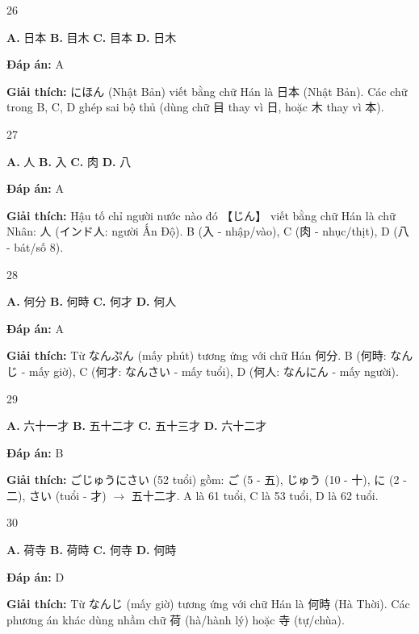 \documentclass[12pt,a4paper]{report}
\newcommand{\source}[1]{}
\newcommand{\choice}[2]{\textbf{#1.} #2 \quad}
\newcommand{\answer}[1]{\par\textbf{Đáp án:} #1}
\newcommand{\confidence}[1]{}
\newcommand{\explain}[1]{\par\textbf{Giải thích:} #1\vspace{0.5cm}}
\begin{document}
\begin{question}{26}
\source{Q5.jpg}
\choice{A}{日本}
\choice{B}{目木}
\choice{C}{目本}
\choice{D}{日木}
\answer{A}
\confidence{high}
\explain{にほん (Nhật Bản) viết bằng chữ Hán là 日本 (Nhật Bản). Các chữ trong B, C, D ghép sai bộ thủ (dùng chữ 目 thay vì 日, hoặc 木 thay vì 本).}
\end{question}

\begin{question}{27}
\source{Q6.jpg}
\choice{A}{人}
\choice{B}{入}
\choice{C}{肉}
\choice{D}{八}
\answer{A}
\confidence{high}
\explain{Hậu tố chỉ người nước nào đó 【じん】 viết bằng chữ Hán là chữ Nhân: 人 (インド人: người Ấn Độ). B (入 - nhập/vào), C (肉 - nhục/thịt), D (八 - bát/số 8).}
\end{question}

\begin{question}{28}
\source{Q7.jpg}
\choice{A}{何分}
\choice{B}{何時}
\choice{C}{何才}
\choice{D}{何人}
\answer{A}
\confidence{high}
\explain{Từ なんぷん (mấy phút) tương ứng với chữ Hán 何分. B (何時: なんじ - mấy giờ), C (何才: なんさい - mấy tuổi), D (何人: なんにん - mấy người).}
\end{question}

\begin{question}{29}
\source{Q8.jpg}
\choice{A}{六十一才}
\choice{B}{五十二才}
\choice{C}{五十三才}
\choice{D}{六十二才}
\answer{B}
\confidence{high}
\explain{ごじゅうにさい (52 tuổi) gồm: ご (5 - 五), じゅう (10 - 十), に (2 - 二), さい (tuổi - 才) $\rightarrow$ 五十二才. A là 61 tuổi, C là 53 tuổi, D là 62 tuổi.}
\end{question}

\begin{question}{30}
\source{Q4.webp}
\choice{A}{荷寺}
\choice{B}{荷時}
\choice{C}{何寺}
\choice{D}{何時}
\answer{D}
\confidence{high}
\explain{Từ なんじ (mấy giờ) tương ứng với chữ Hán là 何時 (Hà Thời). Các phương án khác dùng nhầm chữ 荷 (hà/hành lý) hoặc 寺 (tự/chùa).}
\end{question}
\end{document}
